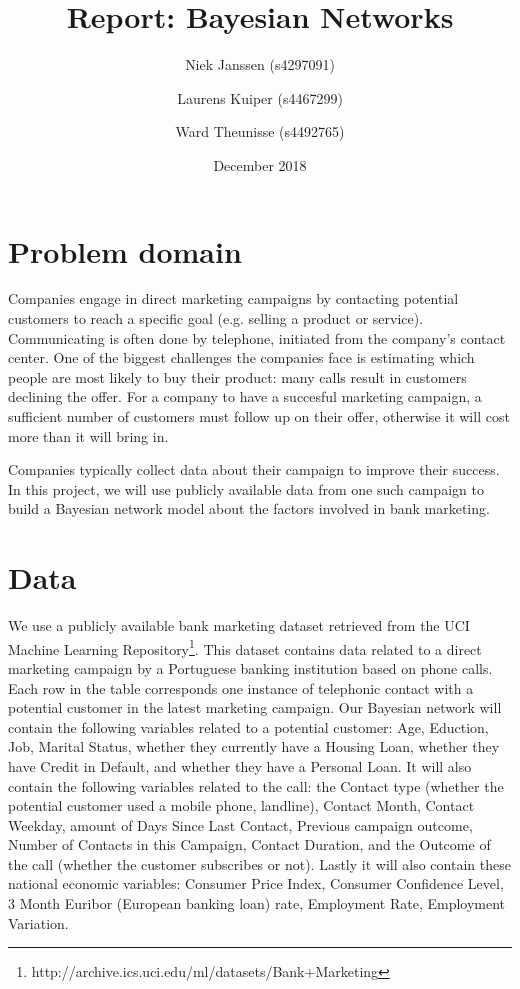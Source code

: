 \documentclass[11pt]{article}
\title{Report: Bayesian Networks}
\date{December 2018}
\author{Niek Janssen (s4297091)\and Laurens Kuiper (s4467299)\and Ward Theunisse (s4492765)}
\begin{document}
\maketitle
\thispagestyle{empty}
\begin{multicols}{2}
\section{Problem domain}
Companies engage in direct marketing campaigns by contacting potential customers to reach a specific goal (e.g. selling a product or service).
Communicating is often done by telephone, initiated from the company's contact center.
One of the biggest challenges the companies face is estimating which people are most likely to buy their product: many calls result in customers declining the offer.
For a company to have a succesful marketing campaign, a sufficient number of customers must follow up on their offer, otherwise it will cost more than it will bring in.

Companies typically collect data about their campaign to improve their success.
In this project, we will use publicly available data from one such campaign to build a Bayesian network model about the factors involved in bank marketing.

\section{Data}
We use a publicly available bank marketing dataset retrieved from the UCI Machine Learning Repository\footnote{http://archive.ics.uci.edu/ml/datasets/Bank+Marketing}. This dataset contains data related to a direct marketing campaign by a Portuguese banking institution based on phone calls. Each row in the table corresponds one instance of telephonic contact with a potential customer in the latest marketing campaign. Our Bayesian network will contain the following variables related to a potential customer: Age, Eduction, Job, Marital Status, whether they currently have a Housing Loan, whether they have Credit in Default, and whether they have a Personal Loan.
It will also contain the following variables related to the call: the Contact type (whether the potential customer used a mobile phone, landline), Contact Month, Contact Weekday, amount of Days Since Last Contact, Previous campaign outcome, Number of Contacts in this Campaign, Contact Duration, and the Outcome of the call (whether the customer subscribes or not).
Lastly it will also contain these national economic variables:
Consumer Price Index, Consumer Confidence Level, 3 Month Euribor (European banking loan) rate, Employment Rate, Employment Variation.


\end{multicols}
\end{document}

